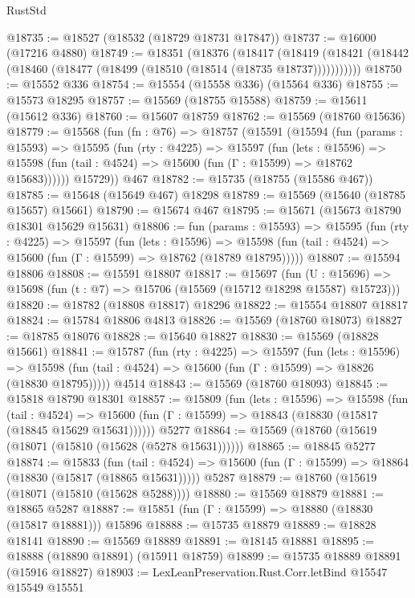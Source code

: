 \begin{lexlean}{RustStd}
\begin{coremodule}
{\begin{coremodule}
{{{{{{{{{{{{{{{{{{{{{{{{{{{{{{{{{{{{{{{{{{{{{{{{{{{{{{{{{{{{@18735 := @18527 (@18532 (@18729 @18731 @17847))
@18737 := @16000 (@17216 @4880)
@18749 := @18351
    (@18376
      (@18417
        (@18419 (@18421 (@18442 (@18460 (@18477 (@18499 (@18510 (@18514 (@18735 @18737)))))))))))
@18750 := @15552 @336
@18754 := @15554 (@15558 @336) (@15564 @336)
@18755 := @15573 @18295
@18757 := @15569 (@18755 @15588)
@18759 := @15611 (@15612 @336)
@18760 := @15607 @18759
@18762 := @15569 (@18760 @15636)
@18779 := @15568
    (fun (fn : @76) =>
    @18757
      (@15591
        (@15594
          (fun (params : @15593) =>
          @15595
            (fun (rty : @4225) =>
            @15597
              (fun (lets : @15596) =>
              @15598 (fun (tail : @4524) => @15600 (fun (Γ : @15599) => @18762 @15683))))))
        @15729))
    @467
@18782 := @15735 (@18755 (@15586 @467))
@18785 := @15648 (@15649 @467) @18298
@18789 := @15569 (@15640 (@18785 @15657) @15661)
@18790 := @15674 @467
@18795 := @15671 (@15673 @18790 @18301 @15629 @15631)
@18806 := fun (params : @15593) =>
  @15595
    (fun (rty : @4225) =>
    @15597
      (fun (lets : @15596) =>
      @15598 (fun (tail : @4524) => @15600 (fun (Γ : @15599) => @18762 (@18789 @18795)))))
@18807 := @15594 @18806
@18808 := @15591 @18807
@18817 := @15697
    (fun (U : @15696) => @15698 (fun (t : @7) => @15706 (@15569 (@15712 @18298 @15587) @15723)))
@18820 := @18782 (@18808 @18817) @18296
@18822 := @15554 @18807 @18817
@18824 := @15784 @18806 @4813
@18826 := @15569 (@18760 @18073)
@18827 := @18785 @18076
@18828 := @15640 @18827
@18830 := @15569 (@18828 @15661)
@18841 := @15787
    (fun (rty : @4225) =>
    @15597
      (fun (lets : @15596) =>
      @15598 (fun (tail : @4524) => @15600 (fun (Γ : @15599) => @18826 (@18830 @18795)))))
    @4514
@18843 := @15569 (@18760 @18093)
@18845 := @15818 @18790 @18301
@18857 := @15809
    (fun (lets : @15596) =>
    @15598
      (fun (tail : @4524) =>
      @15600 (fun (Γ : @15599) => @18843 (@18830 (@15817 (@18845 @15629 @15631))))))
    @5277
@18864 := @15569 (@18760 (@15619 (@18071 (@15810 (@15628 (@5278 @15631))))))
@18865 := @18845 @5277
@18874 := @15833
    (fun (tail : @4524) => @15600 (fun (Γ : @15599) => @18864 (@18830 (@15817 (@18865 @15631)))))
    @5287
@18879 := @18760 (@15619 (@18071 (@15810 (@15628 @5288))))
@18880 := @15569 @18879
@18881 := @18865 @5287
@18887 := @15851 (fun (Γ : @15599) => @18880 (@18830 (@15817 @18881))) @15896
@18888 := @15735 @18879
@18889 := @18828 @18141
@18890 := @15569 @18889
@18891 := @18145 @18881
@18895 := @18888 (@18890 @18891) (@15911 @18759)
@18899 := @15735 @18889 @18891 (@15916 @18827)
@18903 := LexLeanPreservation.Rust.Corr.letBind @15547 @15549 @15551
}}}}}}}}}}}}}}}}}}}}}}}}}}}}}}}}}}}}}}}}}}}}}}}}}}}}}}}}}}}}
\end{coremodule}}
\end{coremodule}
\end{lexlean}
